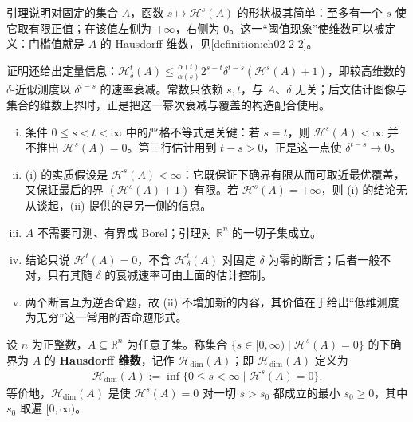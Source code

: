 \documentclass[../../main.tex]{subfiles}%
\begin{document}
\begin{remark}\label{remark:ch02-lem-2-2-动机}
引理说明对固定的集合 $A$，函数 $s\mapsto\mathcal{H}^s(A)$ 的形状极其简单：至多有一个 $s$ 使它取有限正值；在该值左侧为 $+\infty$，右侧为 $0$。这一“阈值现象”使维数可以被定义：门槛值就是 $A$ 的 Hausdorff 维数，见\cref{definition:ch02-2-2}。%

证明还给出定量信息：$\mathcal{H}^t_\delta(A)\leqslant\frac{\alpha(t)}{\alpha(s)}2^{s-t}\delta^{t-s}(\mathcal{H}^s(A)+1)$，即较高维数的 $\delta$-近似测度以 $\delta^{t-s}$ 的速率衰减。常数只依赖 $s,t$，与 $A$、$\delta$ 无关；后文估计图像与集合的维数上界时，正是把这一幂次衰减与覆盖的构造配合使用。
\end{remark}

\begin{remark}\label{remark:ch02-lem-2-2-条件}
\begin{enumerate}[(i)]
\item 条件 $0\leqslant s<t<\infty$ 中的严格不等式是关键：若 $s=t$，则 $\mathcal{H}^s(A)<\infty$ 并不推出 $\mathcal{H}^s(A)=0$。第三行估计用到 $t-s>0$，正是这一点使 $\delta^{t-s}\to0$。
\item (i) 的实质假设是 $\mathcal{H}^s(A)<\infty$：它既保证下确界有限从而可取近最优覆盖，又保证最后的界 $(\mathcal{H}^s(A)+1)$ 有限。若 $\mathcal{H}^s(A)=+\infty$，则 (i) 的结论无从谈起，(ii) 提供的是另一侧的信息。
\item $A$ 不需要可测、有界或 Borel；引理对 $\mathbb{R}^n$ 的一切子集成立。
\item 结论只说 $\mathcal{H}^t(A)=0$，不含 $\mathcal{H}^t_\delta(A)$ 对固定 $\delta$ 为零的断言；后者一般不对，只有其随 $\delta$ 的衰减速率可由上面的估计控制。
\item 两个断言互为逆否命题，故 (ii) 不增加新的内容，其价值在于给出“低维测度为无穷”这一常用的否命题形式。
\end{enumerate}
\end{remark}

\begin{definition}[Hausdorff 维数]\label{definition:ch02-2-2}
设 $n$ 为正整数，$A\subseteq\mathbb{R}^n$ 为任意子集。称集合 $\{s\in[0,\infty)\mid\mathcal{H}^s(A)=0\}$ 的下确界为 $A$ 的 \textbf{Hausdorff 维数}，记作 $\mathcal{H}_{\dim}(A)$；即 $\mathcal{H}_{\dim}(A)$ 定义为
\begin{align*}
\mathcal{H}_{\dim}(A):=\inf\{0\leqslant s<\infty\mid\mathcal{H}^s(A)=0\}.
\end{align*}
等价地，$\mathcal{H}_{\dim}(A)$ 是使 $\mathcal{H}^s(A)=0$ 对一切 $s>s_0$ 都成立的最小 $s_0\geqslant0$，其中 $s_0$ 取遍 $[0,\infty)$。
\end{definition}
\end{document}
